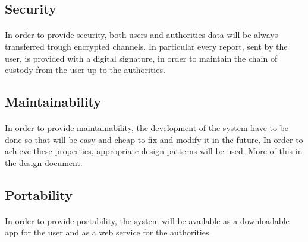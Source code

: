 			\subsection{Security}
				\paragraph{}
					In order to provide security, both users and authorities data will be always transferred trough encrypted channels. In particular every report, sent by the user, is provided with a digital signature, in order to maintain the chain of custody from the user up to the authorities.
			\subsection{Maintainability}
				\paragraph{}
					In order to provide maintainability, the development of the system have to be done so that will be easy and cheap to fix and modify it in the future. In order to achieve these properties, appropriate design patterns will be used. More of this in the design document.
			\subsection{Portability}
				\paragraph{}
					In order to provide portability, the system will be available as a downloadable app for the user and as a web service for the authorities.
	